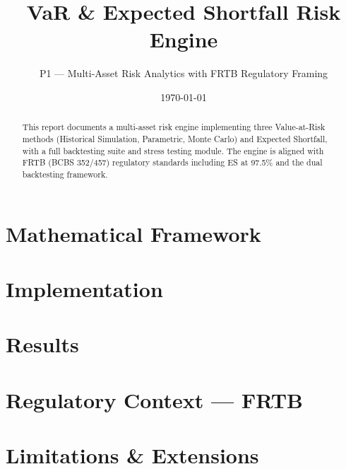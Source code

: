 \documentclass[11pt,a4paper]{article}
\title{VaR \& Expected Shortfall Risk Engine}
\author{P1 — Multi-Asset Risk Analytics with FRTB Regulatory Framing}
\date{\today}
\begin{document}
\maketitle

\begin{abstract}
This report documents a multi-asset risk engine implementing three Value-at-Risk
methods (Historical Simulation, Parametric, Monte Carlo) and Expected Shortfall,
with a full backtesting suite and stress testing module. The engine is aligned
with FRTB (BCBS 352/457) regulatory standards including ES at 97.5\% and the
dual backtesting framework.
\end{abstract}

\section{Mathematical Framework}
\section{Implementation}
\section{Results}
\section{Regulatory Context — FRTB}
\section{Limitations \& Extensions}
\end{document}
